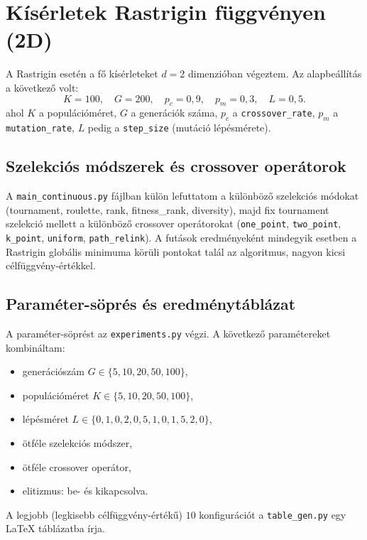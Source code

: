 \documentclass[a4paper,12pt]{article}
\begin{document}
\section{Kísérletek Rastrigin függvényen (2D)}

A Rastrigin esetén a fő kísérleteket $d=2$ dimenzióban végeztem.
Az alapbeállítás a következő volt:
\[
  K = 100,\quad
  G = 200,\quad
  p_c = 0{,}9,\quad
  p_m = 0{,}3,\quad
  L = 0{,}5.
\]
ahol $K$ a populációméret, $G$ a generációk száma,
$p_c$ a \texttt{crossover\_rate}, $p_m$ a \texttt{mutation\_rate},
$L$ pedig a \texttt{step\_size} (mutáció lépésmérete).

\subsection{Szelekciós módszerek és crossover operátorok}

A \texttt{main\_continuous.py} fájlban külön lefuttatom
a különböző szelekciós módokat (tournament, roulette, rank,
fitness\_rank, diversity), majd fix tournament szelekció mellett
a különböző crossover operátorokat
(\texttt{one\_point}, \texttt{two\_point}, \texttt{k\_point},
\texttt{uniform}, \texttt{path\_relink}).
A futások eredményeként mindegyik esetben a Rastrigin globális
minimuma körüli pontokat talál az algoritmus, nagyon kicsi
célfüggvény-értékkel.

\subsection{Paraméter-söprés és eredménytáblázat}

A paraméter-söprést az \texttt{experiments.py} végzi. A következő
paramétereket kombináltam:

\begin{itemize}
  \item generációszám $G \in \{5,10,20,50,100\}$,
  \item populációméret $K \in \{5,10,20,50,100\}$,
  \item lépésméret $L \in \{0{,}1,0{,}2,0{,}5,1{,}0,1{,}5,2{,}0\}$,
  \item ötféle szelekciós módszer,
  \item ötféle crossover operátor,
  \item elitizmus: be- és kikapcsolva.
\end{itemize}

A legjobb (legkisebb célfüggvény-értékű) $10$ konfigurációt
a \texttt{table\_gen.py} egy LaTeX táblázatba írja.
\end{document}
